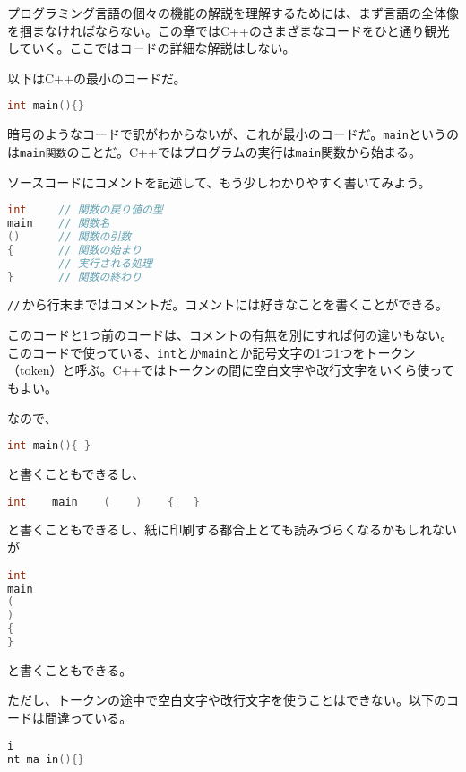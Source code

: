 
プログラミング言語の個々の機能の解説を理解するためには、まず言語の全体像を掴まなければならない。この章ではC++のさまざまなコードをひと通り観光していく。ここではコードの詳細な解説はしない。


以下はC++の最小のコードだ。

\begin{lstlisting}[language={C++}]
int main(){}
\end{lstlisting}

暗号のようなコードで訳がわからないが、これが最小のコードだ。\texttt{main}というのは\texttt{main関数}のことだ。C++ではプログラムの実行は\texttt{main}関数から始まる。

ソースコードにコメントを記述して、もう少しわかりやすく書いてみよう。

\begin{lstlisting}[language={C++}]
int     // 関数の戻り値の型
main    // 関数名
()      // 関数の引数
{       // 関数の始まり
        // 実行される処理
}       // 関数の終わり
\end{lstlisting}

\texttt{//}\,から行末まではコメントだ。コメントには好きなことを書くことができる。

このコードと1つ前のコードは、コメントの有無を別にすれば何の違いもない。このコードで使っている、\texttt{int}とか\texttt{main}とか記号文字の1つ1つをトークン（token）と呼ぶ。C++ではトークンの間に空白文字や改行文字をいくら使ってもよい。

なので、
\begin{lstlisting}[language={C++}]
int main(){ }
\end{lstlisting}
と書くこともできるし、
\begin{lstlisting}[language={C++}]
int    main    (    )    {   }
\end{lstlisting}
と書くこともできるし、紙に印刷する都合上とても読みづらくなるかもしれないが
\begin{lstlisting}[language={C++}]
int
main
(
)
{
}
\end{lstlisting}
と書くこともできる。

ただし、トークンの途中で空白文字や改行文字を使うことはできない。以下のコードは間違っている。

\begin{lstlisting}[language={C++}]
i
nt ma in(){}
\end{lstlisting}

